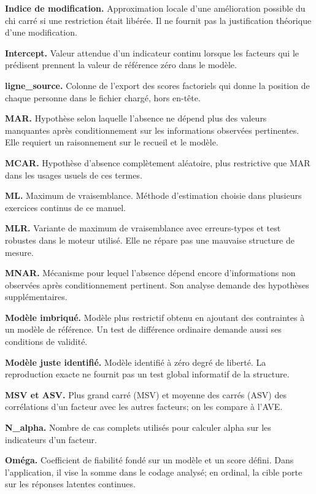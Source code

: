 \documentclass[
  french,
  11pt,
  a4paper,
  DIV=11,
  numbers=noendperiod]{scrreprt}
\begin{document}
\textbf{Indice de modification.} Approximation locale d'une amélioration
possible du chi carré si une restriction était libérée. Il ne fournit
pas la justification théorique d'une modification.

\textbf{Intercept.} Valeur attendue d'un indicateur continu lorsque les
facteurs qui le prédisent prennent la valeur de référence zéro dans le
modèle.

\textbf{ligne\_source.} Colonne de l'export des scores factoriels qui
donne la position de chaque personne dans le fichier chargé, hors
en-tête.

\textbf{MAR.} Hypothèse selon laquelle l'absence ne dépend plus des
valeurs manquantes après conditionnement sur les informations observées
pertinentes. Elle requiert un raisonnement sur le recueil et le modèle.

\textbf{MCAR.} Hypothèse d'absence complètement aléatoire, plus
restrictive que MAR dans les usages usuels de ces termes.

\textbf{ML.} Maximum de vraisemblance. Méthode d'estimation choisie dans
plusieurs exercices continus de ce manuel.

\textbf{MLR.} Variante de maximum de vraisemblance avec erreurs-types et
test robustes dans le moteur utilisé. Elle ne répare pas une mauvaise
structure de mesure.

\textbf{MNAR.} Mécanisme pour lequel l'absence dépend encore
d'informations non observées après conditionnement pertinent. Son
analyse demande des hypothèses supplémentaires.

\textbf{Modèle imbriqué.} Modèle plus restrictif obtenu en ajoutant des
contraintes à un modèle de référence. Un test de différence ordinaire
demande aussi ses conditions de validité.

\textbf{Modèle juste identifié.} Modèle identifié à zéro degré de
liberté. La reproduction exacte ne fournit pas un test global informatif
de la structure.

\textbf{MSV et ASV.} Plus grand carré (MSV) et moyenne des carrés (ASV)
des corrélations d'un facteur avec les autres facteurs; on les compare à
l'AVE.

\textbf{N\_alpha.} Nombre de cas complets utilisés pour calculer alpha
sur les indicateurs d'un facteur.

\textbf{Oméga.} Coefficient de fiabilité fondé sur un modèle et un score
défini. Dans l'application, il vise la somme dans le codage analysé; en
ordinal, la cible porte sur les réponses latentes continues.
\end{document}
